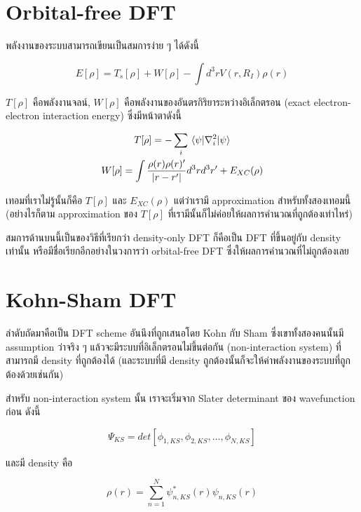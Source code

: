 \section{Orbital-free DFT}

พลังงานของระบบสามารถเขียนเป็นสมการง่าย ๆ ได้ดังนี้

\begin{equation}
    E[\rho] = T_{s}[\rho] + W[\rho] - \int d^{3} r V(r,R_{I}) \rho(r)
\end{equation}

\noindent $T[\rho]$ คือพลังงานจลน์, $W[\rho]$ คือพลังงานของอันตรกิริยาระหว่างอิเล็กตรอน
(exact electron-electron interaction energy) ซึ่งมีหน้าตาดังนี้

\begin{gather}
    T[\rho] = -\sum_{i} \mel{\psi}{\nabla^{2}_{i}}{\psi} \\
    W[\rho] = \int \frac{\rho(r)\rho(r)'}{|r-r'|} d^{3} r d^{3} r' + E_{XC}(\rho)
\end{gather}

เทอมที่เราไม่รู้นั้นก็คือ $T[\rho]$ และ  $E_{XC}(\rho)$ แต่ว่าเรามี approximation สำหรับทั้งสองเทอมนี้
(อย่างไรก็ตาม approximation ของ $T[\rho]$ ที่เรามีนั้นก็ไม่ค่อยให้ผลการคำนวณที่ถูกต้องเท่าไหร่)

สมการด้านบนนี้เป็นของวิธีที่เรียกว่า density-only DFT ก็คือเป็น DFT ที่ขึ้นอยู่กับ density เท่านั้น
หรือมีชื่อเรียกอีกอย่างในวงการว่า orbital-free DFT ซึ่งให้ผลการคำนวณที่ไม่ถูกต้องเลย

\section{Kohn-Sham DFT}

ลำดับถัดมาคือเป็น DFT scheme อันนึงที่ถูกเสนอโดย Kohn กับ Sham ซึ่งเขาทั้งสองคนนั้นมี assumption
ว่าจริง ๆ แล้วจะมีระบบที่อิเล็กตรอนไม่ขึ้นต่อกัน (non-interaction system) ที่สามารถมี density
ที่ถูกต้องได้ (และระบบที่มี density ถูกต้องนั้นก็จะให้ค่าพลังงานของระบบที่ถูกต้องด้วยเช่นกัน)

สำหรับ non-interaction system นั้น เราจะเริ่มจาก Slater determinant ของ wavefunction
ก่อน ดังนี้

\begin{equation}
    \Psi_{KS} = det[\phi_{1,KS}, \phi_{2,KS}, \dots, \phi_{N,KS}]
\end{equation}

\noindent และมี density คือ

\begin{equation}
    \rho(r) = \sum^{N}_{n=1} \psi_{n,KS}^{\ast}(r) \psi_{n,KS}(r)
\end{equation}

